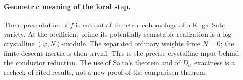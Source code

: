 \paragraph{Geometric meaning of the local step.}
The representation of $f$ is cut out of the etale cohomology of a
Kuga--Sato variety. At the coefficient prime its potentially semistable
realization is a log-crystalline $(\varphi,N)$-module. The separated
ordinary weights force $N=0$; the finite descent inertia is then trivial.
This is the precise crystalline input behind the conductor reduction.
The use of Saito's theorem and of $D_{\mathrm{st}}$ exactness is a
recheck of cited results, not a new proof of the comparison theorem.
